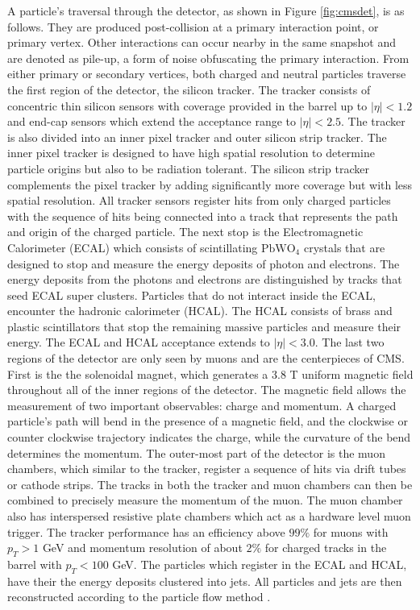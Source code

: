 A particle's traversal through the detector, as shown in Figure \ref{fig:cmsdet}, is as follows. They are produced post-collision at a primary interaction point, or primary vertex. Other interactions can occur nearby in the same snapshot and are denoted as pile-up, a form of noise obfuscating the primary interaction. From either primary or secondary vertices, both charged and neutral particles traverse the first region of the detector, the silicon tracker. The tracker consists of concentric thin silicon sensors with coverage provided in the barrel up to $|\eta|<1.2$ and end-cap sensors which extend the acceptance range to $|\eta| < 2.5$. The tracker is also divided into an inner pixel tracker and outer silicon strip tracker. The inner pixel tracker is designed to have high spatial resolution to determine particle origins but also to be radiation tolerant. The silicon strip tracker complements the pixel tracker by adding significantly more coverage but with less spatial resolution. All tracker sensors  register hits from only charged particles with the sequence of hits being connected into a track that represents the path and origin of the charged particle.  The next stop is the Electromagnetic Calorimeter (ECAL) which consists of scintillating $\text{PbWO}_4$ crystals that are designed to stop and measure the energy deposits of photon and electrons. The energy deposits from the photons and electrons are distinguished by tracks that seed ECAL super clusters. Particles that do not interact inside the ECAL, encounter the hadronic calorimeter (HCAL). The HCAL consists of brass and plastic scintillators that stop the remaining massive particles and measure their energy. The ECAL and HCAL acceptance extends to $|\eta| <3.0$. The last two regions of the detector are only seen by muons and are the centerpieces of CMS. First is the the solenoidal magnet, which generates a 3.8 T uniform magnetic field throughout all of the inner regions of the detector. The magnetic field allows the measurement of two important observables: charge and momentum.  A charged particle's path will bend in the presence of a magnetic field, and the clockwise or counter clockwise trajectory indicates the charge, while the curvature of the bend determines the momentum. The outer-most part of the detector is the muon chambers, which similar to the tracker, register a sequence of hits via drift tubes or cathode strips. The tracks in both the tracker and muon chambers can then be combined to precisely measure the momentum of the muon. The muon chamber also has interspersed resistive plate chambers which act as a hardware level muon trigger. The tracker performance has an efficiency above $99\%$ for muons with $p_T > 1$ GeV and momentum resolution of about $2\%$ for charged tracks in the barrel with $p_T < 100$ GeV. The particles which register in the ECAL and HCAL, have their the energy deposits clustered into jets. All particles and jets are then reconstructed according to the particle flow method \cite{CMS:2017yfk} \cite{CMS:2008xjf} \cite{CMS:2017lum}.

